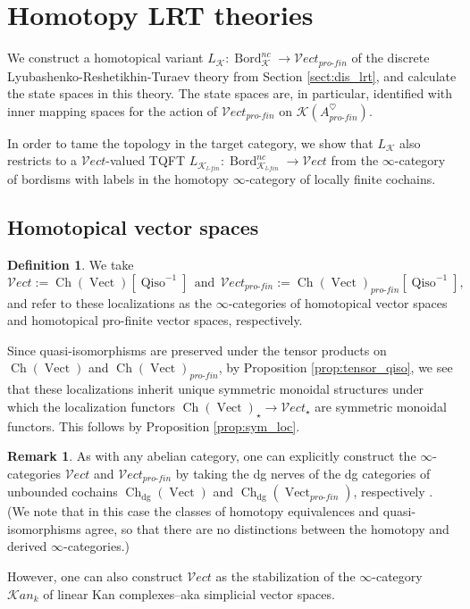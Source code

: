 \documentclass[reqno]{amsart}
\theoremstyle{definition}
\newtheorem{definition}[lemma]{Definition}
\newtheorem{remark}[lemma]{Remark}
\newcommand{\msc}[1]{\mathscr{#1}}
\newcommand{\opn}[1]{\operatorname{#1}}
\newcommand{\Vect}{\msc{V}\!ect}
\newcommand{\pf}{pro\text{-}fin}
\DeclareMathOperator{\Bord}{Bord}
\renewcommand{\1}{\mathbf{1}}
\begin{document}
\section{Homotopy LRT theories}
\label{sect:homtopy_lrt}

We construct a homotopical variant $L_{\msc{K}}:\Bord^{nc}_{\msc{K}}\to \Vect_{\pf}$ of the discrete Lyubashenko-Reshetikhin-Turaev theory from Section \ref{sect:dis_lrt}, and calculate the state spaces in this theory.  The state spaces are, in particular, identified with inner mapping spaces for the action of $\Vect_{\pf}$ on $\msc{K}(A^{\heartsuit}_{\pf})$.
\par

In order to tame the topology in the target category, we show that $L_{\msc{K}}$ also restricts to a $\Vect$-valued TQFT $L_{\msc{K}_{l\text{-}fin}}:\Bord^{nc}_{\msc{K}_{l\text{-}fin}}\to \Vect$ from the $\infty$-category of bordisms with labels in the homotopy $\infty$-category of locally finite cochains.

\subsection{Homotopical vector spaces}

\begin{definition}
We take
\[
\Vect:=\opn{Ch}(\opn{Vect})[\opn{Qiso}^{-1}]\ \ \text{and}\ \ \Vect_{\pf}:=\opn{Ch}(\opn{Vect})_{\pf}[\opn{Qiso}^{-1}],
\]
and refer to these localizations as the $\infty$-categories of homotopical vector spaces and homotopical pro-finite vector spaces, respectively.
\end{definition}

Since quasi-isomorphisms are preserved under the tensor products on $\opn{Ch}(\opn{Vect})$ and $\opn{Ch}(\opn{Vect})_{\pf}$, by Proposition \ref{prop:tensor_qiso}, we see that these localizations inherit unique symmetric monoidal structures under which the localization functors $\opn{Ch}(\opn{Vect})_{\star}\to \Vect_{\star}$ are symmetric monoidal functors. This follows by Proposition \ref{prop:sym_loc}.

\begin{remark}
As with any abelian category, one can explicitly construct the $\infty$-categories $\Vect$ and $\Vect_{\pf}$ by taking the dg nerves of the dg categories of unbounded cochains $\opn{Ch}_{\opn{dg}}(\opn{Vect})$ and $\opn{Ch}_{\opn{dg}}(\opn{Vect}_{\pf})$, respectively \cite[Proposition 1.3.4.5]{ha}.  (We note that in this case the classes of homotopy equivalences and quasi-isomorphisms agree, so that there are no distinctions between the homotopy and derived $\infty$-categories.)
\par

However, one can also construct $\Vect$ as the stabilization of the $\infty$-category $\msc{K}\!an_k$ of linear Kan complexes--aka simplicial vector spaces.
\end{remark}
\end{document}
